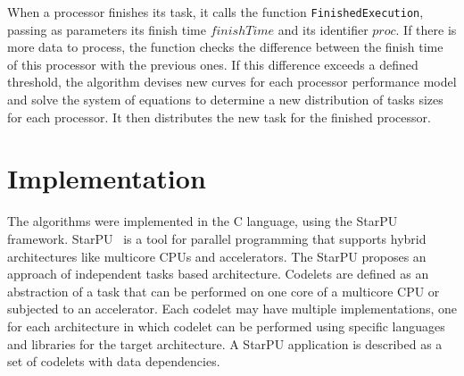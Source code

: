 \documentclass[journal]{IEEEtran}
\begin{document}


When a processor finishes its task, it calls the function \texttt{FinishedExecution}, passing as parameters its finish time $finishTime$ and its identifier $proc$. If there is more data to process, the function checks the difference between the finish time of this processor with the previous ones. If this difference exceeds a defined threshold, the algorithm devises new curves for each processor performance model and solve the system of equations to determine a new distribution of tasks sizes for each processor. It then distributes the new task for the finished processor.


\section{Implementation}

The algorithms were implemented in the C language, using the StarPU framework.
StarPU~\cite{starpu} is a tool for parallel programming that supports hybrid
architectures like multicore CPUs and accelerators. The StarPU proposes an
approach of independent tasks based architecture. Codelets are defined as an
abstraction of a task that can be performed on one core of a multicore CPU or
subjected to an accelerator. Each codelet may have multiple implementations, one
for each architecture in which codelet can be performed using specific languages
and libraries for the target architecture. A StarPU application is described as
a set of codelets with data dependencies.

\end{document}
